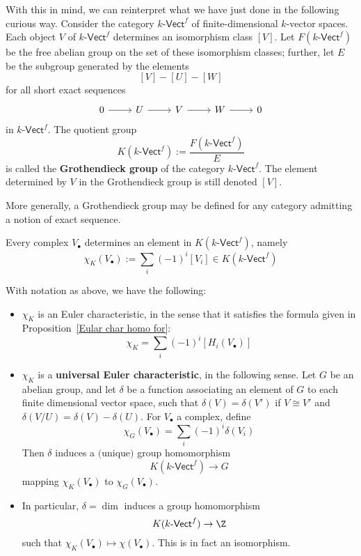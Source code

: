 With this in mind, we can reinterpret what we have just done in the following curious way. Consider the category $k$-$\mathsf{Vect}^{f}$ of finite-dimensional $k$-vector spaces. Each object $V$ of $k$-$\mathsf{Vect}^{f}$ determines an isomorphism class $[V]$. Let $F(\text{$k$-$\mathsf{Vect}^{f}$})$ be the free abelian group on the set of these isomorphism classes; further, let $E$ be the subgroup generated by the elements
\[[V]-[U]-[W]\]
for all short exact sequences
\[\begin{tikzcd}
0\ar[r]&U\ar[r]&V\ar[r]&W\ar[r]&0
\end{tikzcd}\]
in $k$-$\mathsf{Vect}^{f}$. The quotient group
\[K(\text{$k$-$\mathsf{Vect}^{f}$}):=\dfrac{F(\text{$k$-$\mathsf{Vect}^{f}$})}{E}\]
is called the \textbf{Grothendieck group} of the category $k$-$\mathsf{Vect}^{f}$. The element determined by $V$ in the Grothendieck group is still denoted $[V]$.\par
More generally, a Grothendieck group may be defined for any category admitting a notion of exact sequence.\par
Every complex $V_{\bullet}$ determines an element in $K(\text{$k$-$\mathsf{Vect}^{f}$})$, namely
\[\chi_K(V_{\bullet}):=\sum_i(-1)^i[V_i]\in K(\text{$k$-$\mathsf{Vect}^{f}$})\]
\begin{proposition}
With notation as above, we have the following:
\begin{itemize}
\item $\chi_K$ is an Euler characteristic, in the sense that it satisfies the formula given in Proposition~\ref{Eular char homo for}:
\[\chi_K=\sum_{i}(-1)^i[H_i(V_\bullet)]\]
\item $\chi_K$ is a \textbf{universal Euler characteristic}, in the following sense. Let $G$ be an abelian group, and let $\delta$ be a function associating an element of $G$ to each finite dimensional vector space, such that $\delta(V)=\delta(V')$ if $V\cong V'$ and $\delta(V/U)=\delta(V)-\delta(U)$. For $V_\bullet$ a complex, define
\[\chi_G(V_\bullet)=\sum_i(-1)^i\delta(V_i)\]
Then $\delta$ induces a $($unique$)$ group homomorphism
\[K(\text{$k$-$\mathsf{Vect}^{f}$})\to G\]
mapping $\chi_K(V_\bullet)$ to $\chi_G(V_\bullet)$.
\item In particular, $\delta=\dim$ induces a group homomorphism
\[K(\text{$k$-$\mathsf{Vect}^{f}$})\to \Z\]
such that $\chi_K(V_\bullet)\mapsto \chi(V_\bullet)$. This is in fact an isomorphism.
\end{itemize}
\end{proposition}
